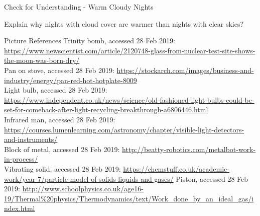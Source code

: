 \documentclass{beamer}
\begin{document}
\begin{frame}{Check for Understanding - Warm Cloudy Nights}
\begin{center}
   Explain why nights with cloud cover are warmer than nights with clear skies?
\end{center}
\end{frame}

\begin{frame}{Picture References}
\tiny
Trinity bomb, accessed 28 Feb 2019: \href{https://www.newscientist.com/article/2120748-glass-from-nuclear-test-site-shows-the-moon-was-born-dry/}{https://www.newscientist.com/article/2120748-glass-from-nuclear-test-site-shows-the-moon-was-born-dry/}\\
Pan on stove, accessed 28 Feb 2019: \href{https://stockarch.com/images/business-and-industry/energy/pan-red-hot-hotplate-8009}{https://stockarch.com/images/business-and-industry/energy/pan-red-hot-hotplate-8009}\\
Light bulb, accessed 28 Feb 2019: \href{https://www.independent.co.uk/news/science/old-fashioned-light-bulbs-could-be-set-for-comeback-after-light-recycling-breakthrough-a6806446.html}{https://www.independent.co.uk/news/science/old-fashioned-light-bulbs-could-be-set-for-comeback-after-light-recycling-breakthrough-a6806446.html}\\
Infrared man, accessed 28 Feb 2019: \href{https://courses.lumenlearning.com/astronomy/chapter/visible-light-detectors-and-instruments/}{https://courses.lumenlearning.com/astronomy/chapter/visible-light-detectors-and-instruments/}\\
Block of metal, accessed 28 Feb 2019: \href{http://beatty-robotics.com/metalbot-work-in-process/}{http://beatty-robotics.com/metalbot-work-in-process/}\\
Vibrating solid, accessed 28 Feb 2019: \href{https://chemstuff.co.uk/academic-work/year-7/particle-model-of-solids-liquids-and-gases/}{https://chemstuff.co.uk/academic-work/year-7/particle-model-of-solids-liquids-and-gases/}
Piston, accessed 28 Feb 2019: \href{http://www.schoolphysics.co.uk/age16-19/Thermal\%20physics/Thermodynamics/text/Work_done_by_an_ideal_gas/index.html}{http://www.schoolphysics.co.uk/age16-19/Thermal\%20physics/Thermodynamics/text/Work\_done\_by\_an\_ideal\_gas/index.html}\\

\end{frame}
\end{document}
